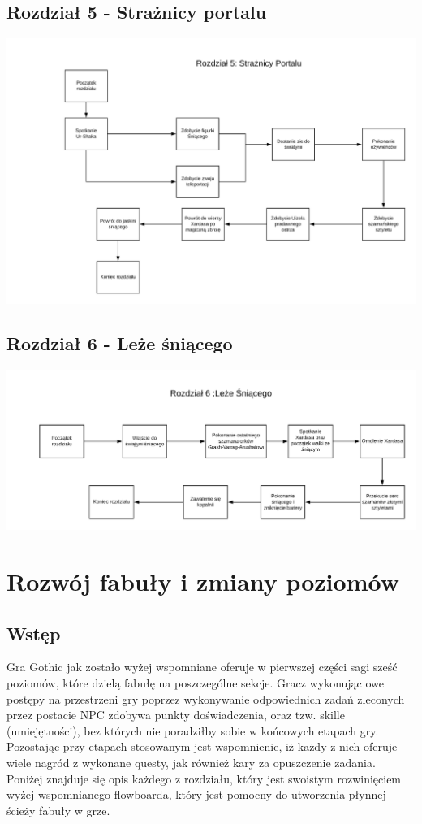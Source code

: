 \documentclass[11pt,polish, openany]{book}
\begin{document}
\section{Rozdział 5 - Strażnicy portalu}
\begin{center}
	\includegraphics[scale=0.16, angle=90]{5}
\end{center}
\section{Rozdział 6 - Leże śniącego}
\begin{center}
	\includegraphics[scale=0.16, angle=90]{6}
\end{center}
\chapter{Rozwój fabuły i zmiany poziomów}\label{chapt:results}
\section{Wstęp}
Gra Gothic jak zostało wyżej wspomniane oferuje w pierwszej części sagi sześć poziomów, które dzielą fabułę na poszczególne sekcje. Gracz wykonując owe postępy na przestrzeni gry poprzez wykonywanie odpowiednich zadań zleconych przez postacie NPC zdobywa punkty doświadczenia, oraz tzw. skille (umiejętności), bez których nie poradziłby sobie w końcowych etapach gry. Pozostając przy etapach stosowanym jest wspomnienie, iż każdy z nich oferuje wiele nagród z wykonane questy, jak również kary za opuszczenie zadania. Poniżej znajduje się opis każdego z rozdziału, który jest swoistym rozwinięciem wyżej wspomnianego flowboarda, który jest pomocny do utworzenia płynnej ścieży fabuły w grze.
\end{document}
